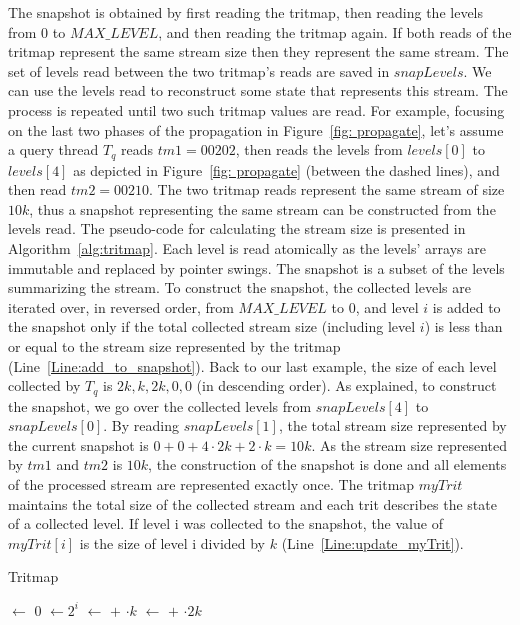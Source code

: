 The snapshot is obtained by first reading the tritmap, then reading the levels from $0$ to $\mathit{MAX\_LEVEL}$, and then reading the tritmap again. If both reads of the tritmap represent the same stream size then they represent the same stream. The set of levels read between the two tritmap's reads are saved in $snapLevels$. We can use the levels read to reconstruct some state that represents this stream. The process is repeated until two such tritmap values are read. For example, focusing on the last two phases of the propagation in Figure~\ref{fig: propagate}, let's assume a query thread $T_q$ reads $tm1=00202$, then reads the levels from $\mathit{levels}[0]$ to $\mathit{levels}[4]$ as depicted in Figure~\ref{fig: propagate} (between the dashed lines), and then read $tm2=00210$. The two tritmap reads represent the same stream of size $10k$, thus a snapshot representing the same stream can be constructed from the levels read. The pseudo-code for calculating the stream size is presented in Algorithm~\ref{alg:tritmap}. Each level is read atomically as the levels' arrays are immutable and replaced by pointer swings. The snapshot is a subset of the levels summarizing the stream. To construct the snapshot, the collected levels are iterated over, in reversed order, from $\mathit{MAX\_LEVEL}$ to $0$, and level $i$ is added to the snapshot only if the total collected stream size (including level $i$) is less than or equal to the stream size represented by the tritmap (Line~\ref{Line:add_to_snapshot}). Back to our last example, the size of each level collected by $T_q$ is ${2k,k,2k,0,0}$ (in descending order). As explained, to construct the snapshot, we go over the collected levels from $\mathit{snapLevels}[4]$ to $\mathit{snapLevels}[0]$. By reading $snapLevels[1]$, the total stream size represented by the current snapshot is $0+0+4\cdot2k+2\cdot k = 10k$. As the stream size represented by $tm1$ and $tm2$ is $10k$, the construction of the snapshot is done and all elements of the processed stream are represented exactly once. The tritmap $\mathit{myTrit}$ maintains the total size of the collected stream and each trit describes the state of a collected level. If level i was collected to the snapshot, the value of $\mathit{myTrit[i]}$ is the size of level i divided by $k$ (Line~\ref{Line:update_myTrit}). 

 
\begin{algorithm}[h]
\caption{Tritmap} \label{alg:tritmap}
\begin{algorithmic}[1]
\setcounter{ALG@line}{\value{mycounter}}
        \State {} $\gets$ 0
            \State {} $\gets 2^i $
                \State {} $\gets$  $+$ $\cdot k$
                     \State {} $\gets$  $+$ $\cdot 2k$
            \EndIf
        \EndFor
        \State {}
\EndProcedure
\setcounter{mycounter}{\value{ALG@line}}
\end{algorithmic}
\end{algorithm}
 

